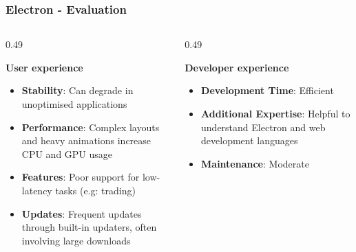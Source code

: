 \begin{frame}



\frametitle{Electron - Evaluation}

\vspace{-30pt}
\begin{columns}[T,onlytextwidth]
    \begin{column}{0.49\textwidth}
        \begin{theorembox}
        \textbf{User experience}
        \vspace{5pt}
        \begin{itemize}
            \setlength{\itemsep}{4pt}
            \item \textbf{Stability}: Can degrade in  unoptimised applications
            \item \textbf{Performance}: Complex layouts and heavy animations increase CPU and GPU usage
            \item \textbf{Features}: Poor support for low-latency tasks (e.g: trading)
            \item \textbf{Updates}: Frequent updates through built-in updaters, often involving large downloads
        \end{itemize}
        \vspace{4pt}
        \end{theorembox}
    \end{column}

    \begin{column}{0.49\textwidth}
        \begin{theorembox}
        \textbf{Developer experience}
        \vspace{5pt}
        \begin{itemize}            
            \setlength{\itemsep}{4pt}
            \item \textbf{Development Time}: Efficient
            \item \textbf{Additional Expertise}: Helpful to understand Electron and web development languages
            \item \textbf{Maintenance}: Moderate
        \end{itemize}
        \vspace{78pt}
        \end{theorembox}
    \end{column}
\end{columns}


\end{frame}